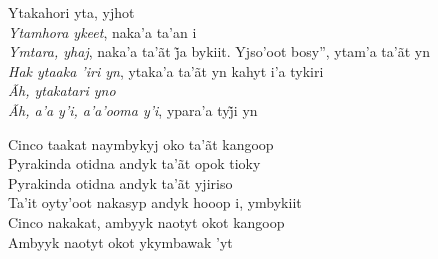 \bigskip

\begin{linenumbers}\begingroup\raggedright

\noindent   Ytakahori yta, yjhot\\
  \emph{Ytamhora ykeet}, naka'a ta'an i\\
  \emph{Ymtara, yhaj}, naka’a ta’ãt j̃a bykiit. Yjso’oot bosy'', ytam’a ta’ãt yn\\
  \emph{Hak ytaaka 'iri yn}, ytaka'a ta'ãt yn kahyt i'a tykiri\\
  \emph{Ãh, ytakatari yno}\\
  \emph{Ãh, a’a y’i, a’a’ooma y’i}, ypara’a tyj̃i yn

\end{linenumbers}\endgroup

\bigskip

\begin{linenumbers}\begingroup\raggedright

\noindent   Cinco taakat naymbykyj oko ta'ãt kangoop\\
  Pyrakinda otidna andyk ta'ãt opok tioky\\
  Pyrakinda otidna andyk ta'ãt yjiriso\\
  Ta'it oyty'oot nakasyp andyk hooop i, ymbykiit\\
  Cinco nakakat, ambyyk naotyt okot kangoop\\
  Ambyyk naotyt okot ykymbawak 'yt

\end{linenumbers}\endgroup

\bigskip

